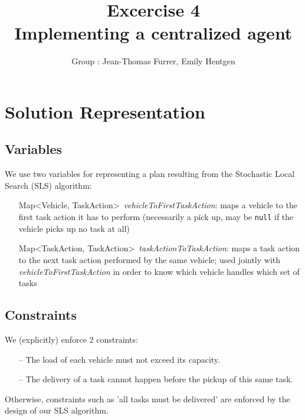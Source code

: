\documentclass[10pt]{article}
\title{\bf Excercise 4\\ Implementing a centralized agent}
\author{Group \textnumero 23: Jean-Thomas Furrer, Emily Hentgen}
\begin{document}
\maketitle

\section{Solution Representation}

\subsection{Variables}
We use two variables for representing a plan resulting from the Stochastic Local Search (SLS) algorithm:
\begin{itemize}
\item[]Map\textless Vehicle, TaskAction\textgreater\ \textit{vehicleToFirstTaskAction}: maps a vehicle to the first task action it has to perform (necessarily a pick up, may be \texttt{null} if the vehicle picks up no task at all)
\item[]Map\textless TaskAction, TaskAction\textgreater\ \textit{taskActionToTaskAction}: maps a task action to the next task action performed by the same vehicle; used jointly with \textit{vehicleToFirstTaskAction} in order to know which vehicle handles which set of tasks
\end{itemize}



\subsection{Constraints}
We (explicitly) enforce 2 constraints:
\begin{itemize}
\itemsep 0mm
\item[--] The load of each vehicle must not exceed its capacity.
\item[--] The delivery of a task cannot happen before the pickup of this same task.
\end{itemize}

Otherwise, constraints such as 'all tasks must be delivered' are enforced by the design of our SLS algorithm.
\end{document}
